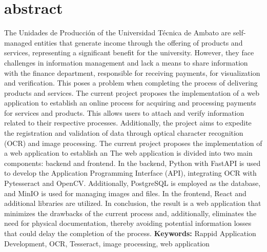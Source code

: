 \newpage
\chapter*{abstract}
The Unidades de Producción of the Universidad Técnica de Ambato  are self-managed 
entities that generate income through the offering of products and services, 
representing a significant benefit for the university. However, they face challenges in 
information management and lack a means to share information with the finance 
department, responsible for receiving payments, for visualization and verification. This 
poses a problem when completing the process of delivering products and services.
\bigbreak
The current project proposes the implementation of a web application to establish an 
online process for acquiring and processing payments for services and products. This 
allows users to attach and verify information related to their respective processes. 
Additionally, the project aims to expedite the registration and validation of data 
through optical character recognition (OCR) and image processing.
\bigbreak
The current project proposes the implementation of a web application to establish an 
The web application is divided into two main components: backend and frontend. In the 
backend, Python with FastAPI is used to develop the Application Programming Interface 
(API), integrating OCR with Pytesseract and OpenCV. Additionally, PostgreSQL is employed 
as the database, and MinIO is used for managing images and files. In the frontend, React 
and additional libraries are utilized.
\bigbreak
In conclusion, the result is a web application that minimizes the drawbacks of the 
current process and, additionally, eliminates the need for physical documentation, 
thereby avoiding potential information losses that could delay the completion of the 
process.
\vfill
\textbf{Keywords:} Rappid Application Development, OCR, Tesseract, image processing, web application
